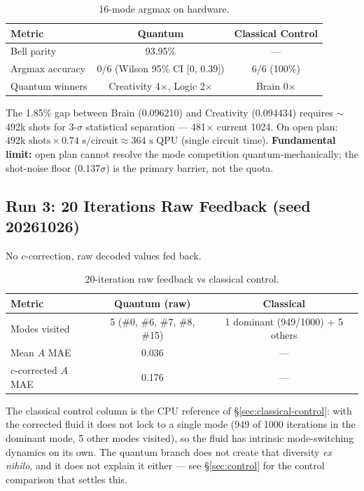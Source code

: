 \documentclass[sigconf,anonymous=false]{acmart}
\begin{document}
\begin{table}[h]
\centering
\caption{16-mode argmax on hardware.}
\label{tab:16mode}
\begin{tabular}{lcc}
\toprule
Metric & Quantum & Classical Control \\
\midrule
Bell parity & 93.95\% & --- \\
Argmax accuracy & 0/6 (Wilson 95\% CI [0, 0.39]) & 6/6 (100\%) \\
Quantum winners & Creativity 4$\times$, Logic 2$\times$ & Brain 0$\times$ \\
\bottomrule
\end{tabular}
\end{table}

The 1.85\% gap between Brain (0.096210) and Creativity (0.094434) requires $\sim$492k shots for 3-$\sigma$ statistical separation --- 481$\times$ current 1024. On open plan: $492\text{k shots} \times 0.74\text{ s/circuit} \approx 364\text{ s QPU}$ (single circuit time). \textbf{Fundamental limit:} open plan cannot resolve the mode competition quantum-mechanically; the shot-noise floor (0.137$\sigma$) is the primary barrier, not the quota.

\subsection{Run 3: 20 Iterations Raw Feedback (seed 20261026)}

No $c$-correction, raw decoded values fed back.

\begin{table}[h]
\centering
\caption{20-iteration raw feedback vs classical control.}
\label{tab:raw20}
\begin{tabular}{lcc}
\toprule
Metric & Quantum (raw) & Classical \\
\midrule
Modes visited & 5 (\#0, \#6, \#7, \#8, \#15) & 1 dominant (949/1000) + 5 others \\
Mean $A$ MAE & 0.036 & --- \\
$c$-corrected $A$ MAE & 0.176 & --- \\
\bottomrule
\end{tabular}
\end{table}

The classical control column is the CPU reference of \S\ref{sec:classical-control}: with the
corrected fluid it does not lock to a single mode (949 of 1000 iterations in the dominant
mode, 5 other modes visited), so the fluid has intrinsic mode-switching dynamics on its
own. The quantum branch does not create that diversity \emph{ex nihilo}, and it does not
explain it either --- see \S\ref{sec:control} for the control comparison that settles this.
\end{document}
